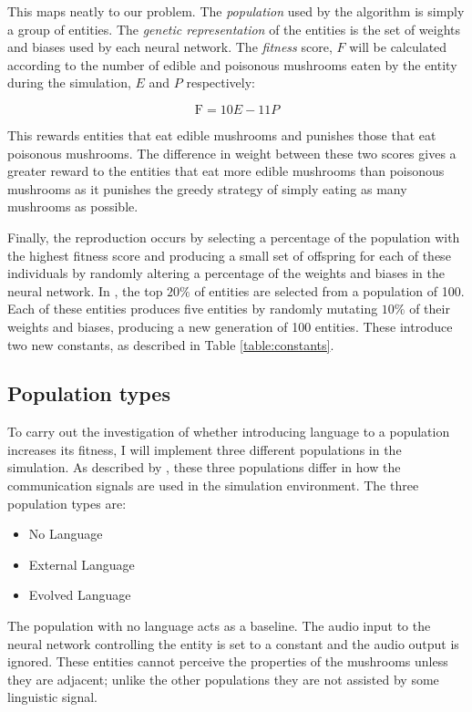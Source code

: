 \documentclass[12pt,a4paper,twoside,openright]{report}
\begin{document}
This maps neatly to our problem. The \emph{population} used by the algorithm is simply a group of entities. The \emph{genetic representation} of the entities is the set of weights and biases used by each neural network. The \emph{fitness} score, $F$ will be calculated according to the number of edible and poisonous mushrooms eaten by the entity during the simulation, $E$ and $P$ respectively:

\[ \mathrm{F} = 10 E- 11 P\]

This rewards entities that eat edible mushrooms and punishes those that eat poisonous mushrooms. The difference in weight between these two scores gives a greater reward to the entities that eat more edible mushrooms than poisonous mushrooms as it punishes the greedy strategy of simply eating as many mushrooms as possible.

Finally, the reproduction occurs by selecting a percentage of the population with the highest fitness score and producing a small set of offspring for each of these individuals by randomly altering a percentage of the weights and biases in the neural network. In \cite{Cangelosi1998}, the top $20\%$ of entities are selected from a population of 100. Each of these entities produces five entities by randomly mutating $10\%$ of their weights and biases, producing a new generation of 100 entities. These introduce two new constants, as described in Table \ref{table:constants}.

\subsection{Population types}\label{section:populations}

To carry out the investigation of whether introducing language to a population increases its fitness, I will implement three different populations in the simulation. As described by \cite{Cangelosi1998}, these three populations differ in how the communication signals are used in the simulation environment. The three population types are:

\begin{itemize}
	\item No Language
	\item External Language
	\item Evolved Language
\end{itemize}

The population with no language acts as a baseline. The audio input to the neural network controlling the entity is set to a constant and the audio output is ignored. These entities cannot perceive the properties of the mushrooms unless they are adjacent; unlike the other populations they are not assisted by some linguistic signal.
\end{document}
